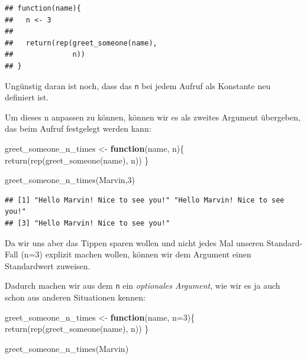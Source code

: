 \documentclass[
]{book}
\newenvironment{Shaded}{\begin{snugshade}}{\end{snugshade}}
\newcommand{\AttributeTok}[1]{\textcolor[rgb]{0.77,0.63,0.00}{#1}}
\newcommand{\ControlFlowTok}[1]{\textcolor[rgb]{0.13,0.29,0.53}{\textbf{#1}}}
\newcommand{\DecValTok}[1]{\textcolor[rgb]{0.00,0.00,0.81}{#1}}
\newcommand{\FunctionTok}[1]{\textcolor[rgb]{0.00,0.00,0.00}{#1}}
\newcommand{\NormalTok}[1]{#1}
\newcommand{\OtherTok}[1]{\textcolor[rgb]{0.56,0.35,0.01}{#1}}
\newcommand{\StringTok}[1]{\textcolor[rgb]{0.31,0.60,0.02}{#1}}
\begin{document}
\begin{verbatim}
## function(name){
##   n <- 3
##   
##   return(rep(greet_someone(name), 
##              n))
## }
\end{verbatim}

Ungünstig daran ist noch, dass das \texttt{n} bei jedem Aufruf als Konstante neu definiert ist.

Um dieses n anpassen zu können, können wir es als zweites Argument übergeben, das beim Aufruf festgelegt werden kann:

\begin{Shaded}
\begin{Highlighting}[]
\NormalTok{greet\_someone\_n\_times }\OtherTok{\textless{}{-}} \ControlFlowTok{function}\NormalTok{(name, n)\{}
  \FunctionTok{return}\NormalTok{(}\FunctionTok{rep}\NormalTok{(}\FunctionTok{greet\_someone}\NormalTok{(name), }
\NormalTok{             n))}
\NormalTok{\}}

\FunctionTok{greet\_someone\_n\_times}\NormalTok{(}\StringTok{\textquotesingle{}Marvin\textquotesingle{}}\NormalTok{,}\DecValTok{3}\NormalTok{)}
\end{Highlighting}
\end{Shaded}

\begin{verbatim}
## [1] "Hello Marvin! Nice to see you!" "Hello Marvin! Nice to see you!"
## [3] "Hello Marvin! Nice to see you!"
\end{verbatim}

Da wir uns aber das Tippen sparen wollen und nicht jedes Mal unseren Standard-Fall (n=3) explizit machen wollen, können wir dem Argument einen Standardwert zuweisen.

Dadurch machen wir aus dem \texttt{n} ein \emph{optionales Argument}, wie wir es ja auch schon aus anderen Situationen kennen:

\begin{Shaded}
\begin{Highlighting}[]
\NormalTok{greet\_someone\_n\_times }\OtherTok{\textless{}{-}} \ControlFlowTok{function}\NormalTok{(name, }\AttributeTok{n=}\DecValTok{3}\NormalTok{)\{}
  \FunctionTok{return}\NormalTok{(}\FunctionTok{rep}\NormalTok{(}\FunctionTok{greet\_someone}\NormalTok{(name), }
\NormalTok{             n))}
\NormalTok{\}}

\FunctionTok{greet\_someone\_n\_times}\NormalTok{(}\StringTok{\textquotesingle{}Marvin\textquotesingle{}}\NormalTok{)}
\end{Highlighting}
\end{Shaded}
\end{document}
